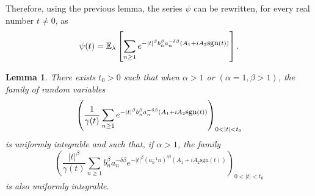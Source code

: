 \documentclass[oneside, a4paper,11pt,reqno]{amsart}
\newtheorem{lem}[hypo]{Lemma}
\begin{document}
Therefore,  using the previous lemma, the series $\psi$ can be rewritten, for
every real number $t\neq 0$, as 
\begin{equation}\label{EQ1}
\psi(t) ={\mathbb E}_\lambda\left[\sum_{n\ge 1}e^{-{|t|}^{\beta} 
    b_n^{\beta}a_ n^{-\delta\beta}(A_1+iA_2 \mbox{\small sgn}(t))}\right].
\end{equation}
\begin{lem}\label{UI}
There exists $t_0>0$ such that when $\alpha>1$ or $(\alpha=1,  \beta> 1)$, 
the family of random variables
$$ \left(\frac 1{\gamma(t)}\sum_{n\ge 1}e^{-{|t|}^{\beta} 
    b_n^{\beta}a_ n^{-\delta\beta}(A_1+iA_2 \mbox{\small sgn}(t))}\right)_{0<|t|<t_0}$$
is uniformly integrable and such that, if $\alpha>1$, the family
$$\left(\frac {|t|^\beta}{\gamma(t)}
\sum_{n\ge 1}  b_n^{\beta}a_ n^{-\delta\beta} e^{-|t|^\beta (a_n^{-1} n)^{\delta\beta}
(A_1+iA_2 \text{sgn} (t) )} \right)_{0<|t|<t_0} $$
is also uniformly integrable.
\end{lem}
\end{document}
